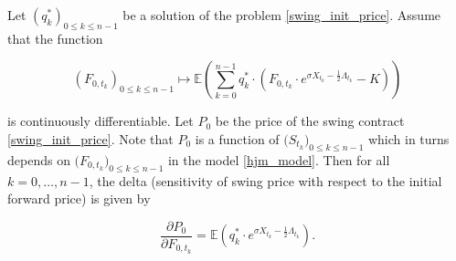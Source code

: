 \documentclass{article}
\numberwithin{equation}{section}
\begin{document}
\begin{Proposition}

Let $\left(q_{k}^{*} \right)_{0 \le k \le n-1}$ be a solution of the problem \eqref{swing_init_price}. Assume that the function

$$\left(F_{0, t_k} \right)_{0 \le k \le n-1} \mapsto \mathbb{E}\left(\sum_{k = 0}^{n-1} q_{k}^{*} \cdot \left( F_{0, t_k} \cdot e^{\sigma X_{t_k} - \frac{1}{2}\Lambda_{t_k}} - K \right) \right)$$

\noindent
is continuously differentiable. Let $P_0$ be the price of the swing contract \eqref{swing_init_price}. Note that $P_0$ is a function of $\big(S_{t_k})_{0 \le k \le n-1}$ which in turns depends on $\big(F_{0,t_k})_{0 \le k \le n-1}$ in the model \eqref{hjm_model}. Then for all $k = 0,\ldots, n-1$, the delta (sensitivity of swing price with respect to the initial forward price) is given by

$$\frac{\partial P_0}{\partial F_{0, t_k}} = \mathbb{E}\left(q_{k}^{*} \cdot e^{\sigma X_{t_k} - \frac{1}{2}\Lambda_{t_k} } \right).$$


\end{Proposition}
\end{document}
